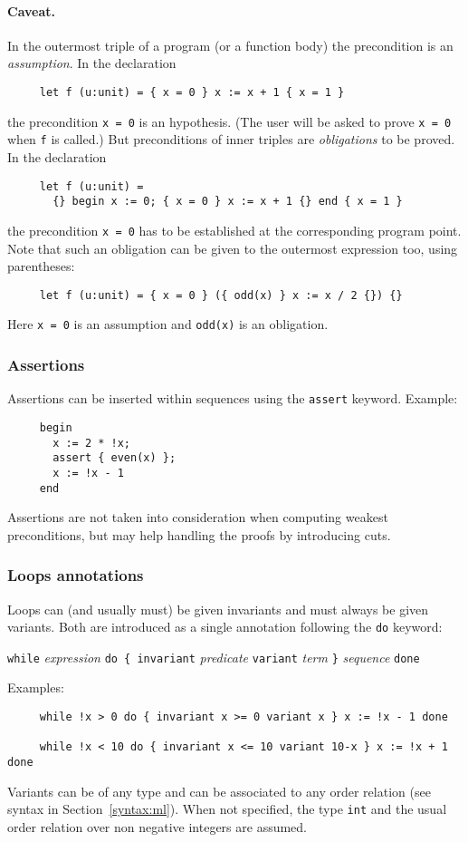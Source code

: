 \documentclass[a4paper,12pt]{report}
\makeatletter
\newcommand{\indextt}[1]{\index{#1@\texttt{#1}}}
\newcommand{\caveat}{\paragraph{Caveat.}}
\makeatother
\begin{document}
\caveat
In the outermost triple of a program (or a function body) the
precondition is an \emph{assumption}. In the declaration
\begin{verbatim}
     let f (u:unit) = { x = 0 } x := x + 1 { x = 1 }
\end{verbatim}
the precondition \texttt{x = 0} is an hypothesis. (The user will be
asked to prove \texttt{x = 0} when \texttt{f} is called.)
But preconditions of inner triples are \emph{obligations} to be
proved. In the declaration 
\begin{verbatim}
     let f (u:unit) = 
       {} begin x := 0; { x = 0 } x := x + 1 {} end { x = 1 }
\end{verbatim}
the precondition \texttt{x = 0} has to be established at the
corresponding program point.
Note that such an obligation can be given to the outermost expression
too, using parentheses:
\begin{verbatim}
     let f (u:unit) = { x = 0 } ({ odd(x) } x := x / 2 {}) {}
\end{verbatim}
Here \texttt{x = 0} is an assumption and \texttt{odd(x)} is an obligation.


\subsubsection{Assertions}
Assertions can be inserted within sequences using the \texttt{assert}
keyword. Example:
\begin{verbatim}
     begin 
       x := 2 * !x;
       assert { even(x) };
       x := !x - 1
     end
\end{verbatim}
Assertions are not taken into consideration when computing weakest
preconditions, but may help handling the proofs by introducing cuts.


\subsubsection{Loops annotations}
\indextt{while}
Loops can (and usually must) be given invariants and must always be
given variants. Both are introduced as a single annotation following
the \texttt{do} keyword:
\begin{center}
  \texttt{while} \textsl{expression} \texttt{do \{ invariant}
  \emph{predicate} \texttt{variant} 
  \textsl{term} \texttt{\}} \textsl{sequence} \texttt{done}
\end{center}
Examples:
\begin{verbatim}
     while !x > 0 do { invariant x >= 0 variant x } x := !x - 1 done

     while !x < 10 do { invariant x <= 10 variant 10-x } x := !x + 1 done
\end{verbatim}
Variants can be of any type and can be associated to any order
relation (see syntax in Section~\ref{syntax:ml}). When not specified,
the type \texttt{int} and the usual order relation over non negative
integers are assumed.
\end{document}
